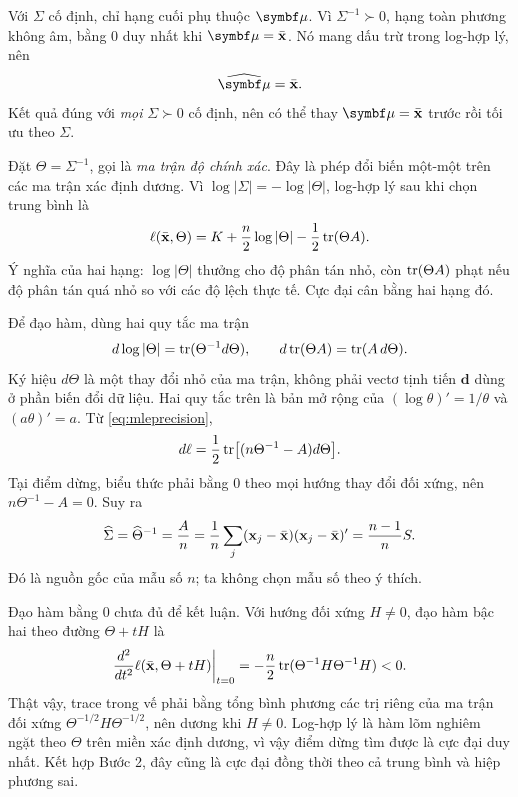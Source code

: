 Với $\Sigma$ cố định, chỉ hạng cuối phụ thuộc $\vmu$. Vì
$\Sigma^{-1}\succ0$, hạng toàn phương không âm, bằng 0 duy nhất khi
$\vmu=\xbar$. Nó mang dấu trừ trong log-hợp lý, nên
\begin{equation}
 \widehat{\vmu}=\xbar.
 \label{eq:mlemeanhat}
\end{equation}
Kết quả đúng với \emph{mọi} $\Sigma\succ0$ cố định, nên có thể thay
$\vmu=\xbar$ trước rồi tối ưu theo $\Sigma$.

Đặt $\Theta=\Sigma^{-1}$, gọi là \emph{ma trận độ chính xác}. Đây là
phép đổi biến một-một trên các ma trận xác định dương. Vì
$\log|\Sigma|=-\log|\Theta|$, log-hợp lý sau khi chọn trung bình là
\begin{equation}
 \ell(\bar{\mathbf x},\Theta)=K+\frac n2\log|\Theta|-\frac12\operatorname{tr}(\Theta A).
 \label{eq:mleprecision}
\end{equation}
Ý nghĩa của hai hạng: $\log|\Theta|$ thưởng cho độ phân tán nhỏ, còn
$\operatorname{tr}(\Theta A)$ phạt nếu độ phân tán quá nhỏ so với các độ lệch thực tế.
Cực đại cân bằng hai hạng đó.

Để đạo hàm, dùng hai quy tắc ma trận
\[
 d\log|\Theta|=\operatorname{tr}(\Theta^{-1}d\Theta),\qquad
 d\operatorname{tr}(\Theta A)=\operatorname{tr}(A\,d\Theta).
\]
Ký hiệu $d\Theta$ là một thay đổi nhỏ của ma trận, không phải vectơ
tịnh tiến $\mathbf d$ dùng ở phần biến đổi dữ liệu. Hai quy tắc trên là
bản mở rộng của $(\log\theta)'=1/\theta$ và $(a\theta)'=a$.
Từ \eqref{eq:mleprecision},
\[
 d\ell=\frac12\operatorname{tr}\bigl[(n\Theta^{-1}-A)d\Theta\bigr].
\]
Tại điểm dừng, biểu thức phải bằng 0 theo mọi hướng thay đổi đối xứng,
nên $n\Theta^{-1}-A=0$. Suy ra
\begin{equation}
 \widehat\Sigma=\widehat\Theta^{-1}=\frac An
 =\frac1n\sum_j(\mathbf x_j-\bar{\mathbf x})(\mathbf x_j-\bar{\mathbf x})'
 =\frac{n-1}{n}S.
 \label{eq:mlecov}
\end{equation}
Đó là nguồn gốc của mẫu số $n$; ta không chọn mẫu số theo ý thích.

Đạo hàm bằng 0 chưa đủ để kết luận. Với hướng đối xứng $H\ne0$, đạo
hàm bậc hai theo đường $\Theta+tH$ là
\[
 \frac{d^2}{dt^2}\ell(\bar{\mathbf x},\Theta+tH)\bigg|_{t=0}
 =-\frac n2\operatorname{tr}(\Theta^{-1}H\Theta^{-1}H)<0.
\]
Thật vậy, trace trong vế phải bằng tổng bình phương các trị riêng của
ma trận đối xứng $\Theta^{-1/2}H\Theta^{-1/2}$, nên dương khi $H\ne0$.
Log-hợp lý là hàm lõm nghiêm ngặt theo $\Theta$ trên miền xác định dương,
vì vậy điểm dừng tìm được là cực đại duy nhất. Kết hợp Bước 2, đây cũng
là cực đại đồng thời theo cả trung bình và hiệp phương sai.

